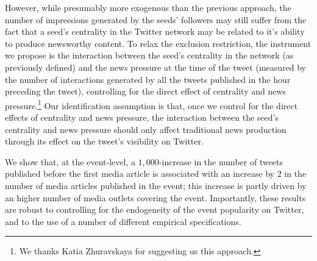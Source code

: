

However, while presumably more exogenous than the previous approach, the number of impressions generated by the seeds' followers may still suffer from the fact that a seed's centrality in the Twitter network may be related to it's ability to produce newsworthy content. To relax the exclusion restriction, the instrument we propose is the interaction between the seed's centrality in the network (as previously defined) and the news pressure at the time of the tweet (measured by the number of interactions generated by all the tweets published in the hour preceding the tweet), controlling for the direct effect of centrality and news pressure.\footnote{We thanks Katia Zhuravskaya for suggesting us this approach.} Our identification assumption is that, once we control for the direct effects of centrality and news pressure, the interaction between the seed's centrality and news pressure should only affect traditional news production through its effect on the tweet's visibility on Twitter.


We show that, at the event-level, a $1,000$-increase in the number of tweets published before the first media article is associated with an increase by $2$ in the number of media articles published in the event; this increase is partly driven by an higher number of media outlets covering the event. Importantly, these results are robust to controlling for the endogeneity of the event popularity on Twitter, and to the use of a number of different empirical specifications.

